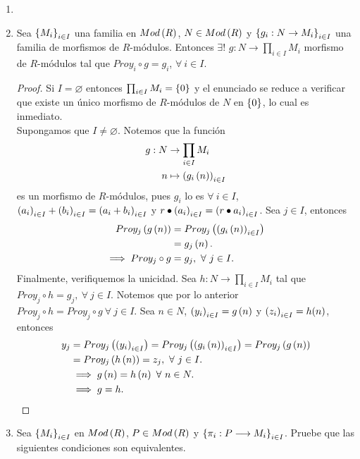 \documentclass{article}
\begin{document}
\begin{enumerate}[label=\textbf{Ej \arabic*.}]
\begin{proof}
			De manera análoga, para cada $i \in I$, la proyección $proy_{i}$ es un epimorfismo, sustituyendo $Inc_{i}$ por $inc_{i}$.\\
		\end{proof}
		\item 
		\item Sea ${\left\{{M}_{i}\right\}}_{i\in I}$ una familia en $Mod\left(R\right)$, $N\in Mod\left(R\right)$ y $\left\{g_i:N\to M_i\right\}_{i\in I}$ una familia de morfismos de $R$-módulos. Entonces $\exists !$ $g:N\to\prod_{i\in I}M_i$ morfismo de $R$-módulos  tal que $Proy_i\circ g=g_i$, $\forall\ i\in I$.
		\begin{proof}
			Si $I=\varnothing$ entonces $\prod_{i\in I}M_i=\left\{0\right\}$ y el enunciado se reduce a verificar que existe un único morfismo de $R$-módulos de $N$ en $\left\{0\right\}$, lo cual es inmediato.\\
		Supongamos que $I\neq\varnothing$. Notemos que la función
		\begin{align*}
			g: N &\rightarrow \prod_{i\in I}M_i\\ n &\mapsto \left(g_i\left(n\right)\right)_{i\in I}
		\end{align*}
es un morfismo de $R$-módulos, pues $g_i$ lo es $\forall\ i\in I$, ${\left({a}_{i}\right)}_{i\in I}+{\left({b}_{i}\right)}_{i\in I}=\left(a_i+b_i\right)_{i\in I}$ y $r\bullet{\left({a}_{i}\right)}_{i\in I}=\left(r\bullet a_i\right)_{i\in I}$. Sea $j\in I$, entonces
\begin{align*}
	Proy_j\left(g\left(n\right)\right)&=Proy_j\left(\left(g_i\left(n\right)\right)_{i\in I}\right)\\
	&=g_j\left(n\right).\\
	\implies Proy_j\circ g&=g_j,\ \forall\ j\in I.
\end{align*}
Finalmente, verifiquemos la unicidad. Sea $h:N\to\prod_{i\in I}M_i$ tal que $Proy_j\circ h=g_j,\ \forall\ j\in I$. Notemos que por lo anterior $Proy_j\circ h=Proy_j\circ g\ \forall\ j\in I$. Sea $n\in N$, ${\left({y}_{i}\right)}_{i\in I}=g\left(n\right)$ y ${\left({z}_{i}\right)}_{i\in I}=h(n)$, entonces
\begin{align*}
	y_j&=Proy_j\left({\left({y}_{i}\right)}_{i\in I}\right)=Proy_j\left(\left(g_i\left(n\right)\right)_{i\in I}\right)=Proy_j\left(g\left(n\right)\right)\\
	&=Proy_j\left(h\left(n\right)\right)= z_j,\ \forall\ j\in I.\\
	&\implies g\left(n\right)=h\left(n\right)\ \forall\ n\in N.\\
	&\implies g=h.
\end{align*}
		\end{proof}
	\item %
	 Sea ${\left\{{M}_{i}\right\}}_{i\in I}$ en $Mod\left(R\right)$, $P \in Mod\left(R\right)$ y $\left\{\pi_{i}: P \longrightarrow M_{i}\right\}_{i \in I}$. Pruebe que las siguientes condiciones son equivalentes.

\end{enumerate}
\end{document}
